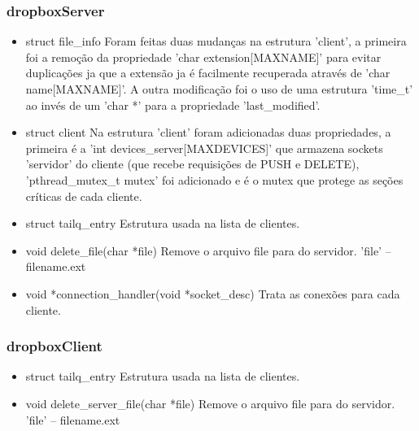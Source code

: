 \documentclass[a4paper]{article}
\begin{document}
\subsubsection{dropboxServer}
\begin{itemize}
	\item struct file\_info
	\newline Foram feitas duas mudanças na estrutura 'client', a primeira foi a remoção da propriedade 'char extension[MAXNAME]' para evitar duplicações ja que a extensão ja é facilmente recuperada através de 'char name[MAXNAME]'. A outra modificação foi o uso de uma estrutura 'time\_t' ao invés de um 'char *' para a propriedade 'last\_modified'.
	
	\item struct client
	\newline Na estrutura 'client' foram adicionadas duas propriedades, a primeira é a 'int devices\_server[MAXDEVICES]' que armazena sockets 'servidor' do cliente (que recebe requisições de PUSH e DELETE), 'pthread\_mutex\_t mutex' foi adicionado e é o mutex que protege as seções críticas de cada cliente.
	
	\item struct tailq\_entry
	\newline Estrutura usada na lista de clientes.
	
	\item void delete\_file(char *file)
	\newline Remove o arquivo file para do servidor. 'file' – filename.ext
	
	\item void *connection\_handler(void *socket\_desc)
	\newline Trata as conexões para cada cliente.

\end{itemize}


\subsubsection{dropboxClient}
\begin{itemize}
	\item struct tailq\_entry
	\newline Estrutura usada na lista de clientes.
	
	\item void delete\_server\_file(char *file)
	\newline Remove o arquivo file para do servidor. 'file' – filename.ext
\end{itemize}
\end{document}
